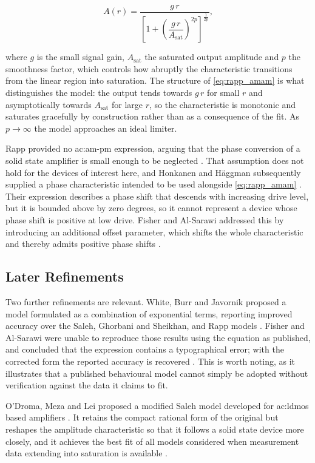 \begin{equation}
  A(r) = \frac{g\,r}{\left[1 + \left(\dfrac{g\,r}{A_{\text{sat}}}\right)^{2p}\right]^{\frac{1}{2p}}},
  \label{eq:rapp_amam}
\end{equation}

where $g$ is the small signal gain, $A_{\text{sat}}$ the saturated output amplitude and $p$ the smoothness factor, which controls how abruptly the characteristic transitions from the linear region into saturation. The structure of \eqref{eq:rapp_amam} is what distinguishes the model: the output tends towards $g\,r$ for small $r$ and asymptotically towards $A_{\text{sat}}$ for large $r$, so the characteristic is monotonic and saturates gracefully by construction rather than as a consequence of the fit. As $p \rightarrow \infty$ the model approaches an ideal limiter.

Rapp provided no \gls{ac:am-pm} expression, arguing that the phase conversion of a solid state amplifier is small enough to be neglected \cite{rapp}. That assumption does not hold for the devices of interest here, and Honkanen and H\"aggman subsequently supplied a phase characteristic intended to be used alongside \eqref{eq:rapp_amam} \cite{honkanen}. Their expression describes a phase shift that descends with increasing drive level, but it is bounded above by zero degrees, so it cannot represent a device whose phase shift is positive at low drive. Fisher and Al-Sarawi addressed this by introducing an additional offset parameter, which shifts the whole characteristic and thereby admits positive phase shifts \cite{fisher}.

\subsection{Later Refinements}\label{sec:later_pa_models}

Two further refinements are relevant. White, Burr and Javornik proposed a model formulated as a combination of exponential terms, reporting improved accuracy over the Saleh, Ghorbani and Sheikhan, and Rapp models \cite{white}. Fisher and Al-Sarawi were unable to reproduce those results using the equation as published, and concluded that the expression contains a typographical error; with the corrected form the reported accuracy is recovered \cite{fisher}. This is worth noting, as it illustrates that a published behavioural model cannot simply be adopted without verification against the data it claims to fit.

O'Droma, Meza and Lei proposed a modified Saleh model developed for \gls{ac:ldmos} based amplifiers \cite{odroma}. It retains the compact rational form of the original but reshapes the amplitude characteristic so that it follows a solid state device more closely, and it achieves the best fit of all models considered when measurement data extending into saturation is available \cite{fisher}.

